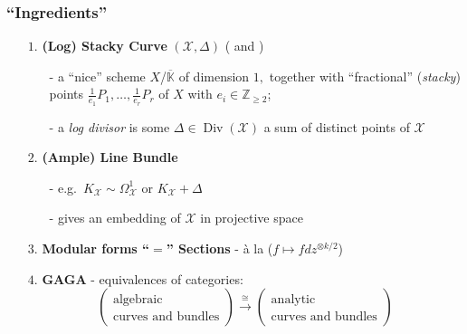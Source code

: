 \documentclass{beamer}
\numberwithin{equation}{section}
\numberwithin{case}{theorem}
\newcommand{\sX}{\mathscr{X}}		%
\newcommand{\bbK}{\mathbb{K}}		%
\newcommand{\bbZ}{\mathbb{Z}}		%
\newcommand{\<}{\left\langle}
\renewcommand{\>}{\right\rangle}
\begin{document}
\begin{frame}
	\frametitle{``Ingredients''}
	\begin{itemize}
		\item[$1.$] \textbf{(Log) Stacky Curve} $(\sX,\Delta)$ (\cite[Def $2.1$]{Landesman-Ruhm-Zhang-Spin-canonical-rings} and \cite[Ch $4$]{VZB}) 
		\begin{itemize}
			\item[-] a ``nice'' scheme $X$/$\overline{\bbK}$ of dimension $1,$ \pause together with ``fractional'' (\emph{stacky}) points $\frac{1}{e_1}P_1,\ldots, \frac{1}{e_r}P_r$ of $X$ with $e_i\in\bbZ_{\geq 2}$; \pause
			\item[-] a \emph{log divisor} is some $\Delta\in \operatorname{Div}(\sX)$ a sum of distinct points of $\sX$
		\end{itemize}
		\pause
		
		\item[$2.$] \textbf{(Ample) Line Bundle} 
		\begin{itemize}
			\item[-] e.g.\ $K_{\sX}\sim \Omega^1_{\sX}$ or $K_{\sX}+\Delta$ \pause 
			\item[-] gives an embedding of $\sX$ in projective space \pause
		\end{itemize} 
		
		\item[$3.$] \textbf{Modular forms ``$=$'' Sections} - \`a la ($f\mapsto fdz^{\otimes k/2}$) \pause
		
		\item[$4.$] \textbf{GAGA} - equivalences of categories: 
		\[\left(\begin{array}{c}\text{algebraic}\\
		\text{curves and bundles}\end{array}\right)\overset{\cong}{\to}\left(\begin{array}{c}\text{analytic}\\
		\text{curves and bundles}\end{array}\right)\]
	\end{itemize}
\end{frame}	
\end{document}
